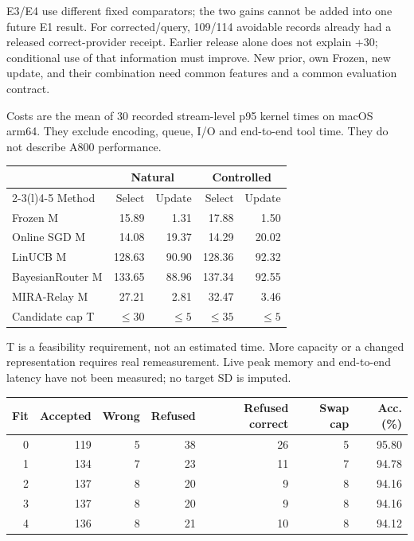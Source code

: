 \documentclass[10pt,letterpaper]{article}
\newcommand{\B}[1]{{\color{GuideBlue}#1}}
\newcommand{\note}[1]{{\fontsize{8.5}{10.5}\selectfont #1\par}}
\newcommand{\sect}[1]{\vspace{5pt}{\large\bfseries #1}\par\vspace{2pt}}
\newenvironment{clean}{\begin{center}\fontsize{9.5}{11.5}\selectfont\setlength{\tabcolsep}{6pt}\renewcommand{\arraystretch}{1.06}}{\end{center}}
\begin{document}
\note{E3/E4 use different fixed comparators; the two gains cannot be added into one future E1 result. For corrected/query, 109/114 avoidable records already had a released correct-provider receipt. Earlier release alone does not explain +30; conditional use of that information must improve. New prior, own Frozen, new update, and their combination need common features and a common evaluation contract.}
\newpage
\sect{E5 / body Table 7: matched cost and feasibility}
Costs are the mean of 30 recorded stream-level p95 kernel times on macOS arm64.
They exclude encoding, queue, I/O and end-to-end tool time. They do not describe A800 performance.
\par\noindent\begin{minipage}{\linewidth}\end{minipage}\par
\begin{clean}\begin{tabular}{@{}lrrrr@{}}
\toprule
& \multicolumn{2}{c}{Natural} & \multicolumn{2}{c}{Controlled} \\ \cmidrule(lr){2-3}\cmidrule(l){4-5} Method & Select & Update & Select & Update \\
\midrule
Frozen M & 15.89 & 1.31 & 17.88 & 1.50 \\
Online SGD M & 14.08 & 19.37 & 14.29 & 20.02 \\
LinUCB M & 128.63 & 90.90 & 128.36 & 92.32 \\
BayesianRouter M & 133.65 & 88.96 & 137.34 & 92.55 \\
MIRA-Relay M & 27.21 & 2.81 & 32.47 & 3.46 \\
\B{Candidate cap T} & \B{$\leq30$} & \B{$\leq5$} & \B{$\leq35$} & \B{$\leq5$} \\
\bottomrule\end{tabular}\end{clean}
\note{T is a feasibility requirement, not an estimated time. More capacity or a changed representation requires real remeasurement. Live peak memory and end-to-end latency have not been measured; no target SD is imputed.}
\sect{E6 / body Table 8: coverage must match within each fitted policy}
\par\noindent\begin{minipage}{\linewidth}\end{minipage}\par
\begin{clean}\begin{tabular}{@{}rrrrrrr@{}}
\toprule
Fit & Accepted & Wrong & Refused & Refused correct & Swap cap & Acc.(\%) \\
\midrule
0 & 119 & 5 & 38 & 26 & 5 & 95.80 \\
1 & 134 & 7 & 23 & 11 & 7 & 94.78 \\
2 & 137 & 8 & 20 & 9 & 8 & 94.16 \\
3 & 137 & 8 & 20 & 9 & 8 & 94.16 \\
4 & 136 & 8 & 21 & 10 & 8 & 94.12 \\
\bottomrule\end{tabular}\end{clean}
\end{document}
